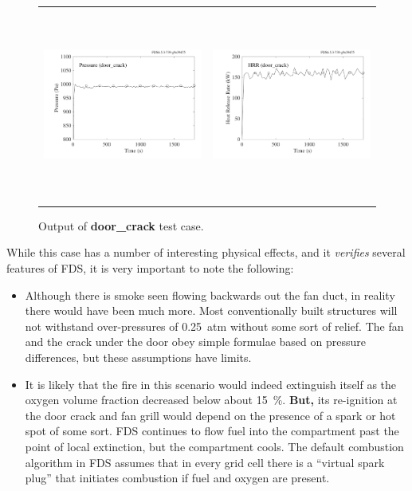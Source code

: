 \documentclass[11pt]{book}
\begin{document}
\begin{figure}[ht]
\begin{tabular*}{\textwidth}{lr}
\includegraphics[height=2.5in]{SCRIPT_FIGURES/door_crack_Pressure} &
\includegraphics[height=2.5in]{SCRIPT_FIGURES/door_crack_HRR}
\end{tabular*}
\caption[Output of {\bf door\_crack} test case.]{Output of {\bf door\_crack} test case.}
\end{figure}

While this case has a number of interesting physical effects, and it {\em verifies} several features of FDS, it is very important to note the following:
\begin{itemize}
\item Although there is smoke seen flowing backwards out the fan duct, in reality there would have been much more. Most conventionally built structures will not withstand over-pressures
of 0.25~atm without some sort of relief. The fan and the crack under the door obey simple formulae based on pressure differences, but these assumptions have limits.
\item It is likely that the fire in this scenario would indeed extinguish itself as the oxygen volume fraction decreased below about 15~\%. {\bf But,} its re-ignition at the door crack
and fan grill would depend on the presence of a spark or hot spot of some sort. FDS continues to flow fuel into the compartment past the point of local extinction, but the compartment
cools. The default combustion algorithm in FDS assumes that in every grid cell there is a ``virtual spark plug'' that initiates combustion if fuel and oxygen are
present.
\end{itemize}
\end{document}
